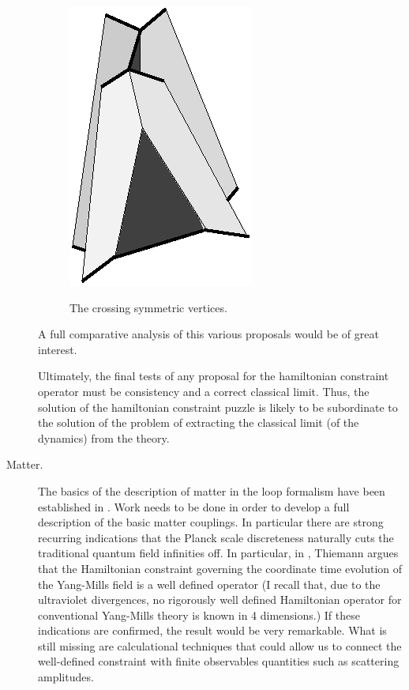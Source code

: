 \documentclass[12pt]{article}
\begin{document}
\begin{description}
\begin{figure}
{ \mbox{\includegraphics{RovelliFig5.eps}}}
 \caption{The crossing symmetric vertices.}
 \end{figure}

A full comparative analysis of this various proposals 
would be of great interest. 

Ultimately, the final tests of any proposal for the 
hamiltonian constraint operator must be consistency and a 
correct classical limit.  Thus, the solution of the 
hamiltonian constraint puzzle is likely to be subordinate 
to the solution of the problem of extracting the classical 
limit (of the dynamics) from the theory.
	
\item[Matter.] 

The basics of the description of matter in the loop 
formalism have been established in 
\cite{MoralesRovelli,MoralesRovelli2,KrasnovMatter,%
Baez,ThiemannFermions,ThiemannYM}.  Work needs to be done in order to 
develop a full description of the basic matter couplings.  In 
particular there are strong recurring indications that the Planck 
scale discreteness naturally cuts the traditional quantum field 
infinities off.  In particular, in \cite{ThiemannYM}, Thiemann argues 
that the Hamiltonian constraint governing the coordinate time 
evolution of the Yang-Mills field is a well defined operator (I recall 
that, due to the ultraviolet divergences, no rigorously well defined 
Hamiltonian operator for conventional Yang-Mills theory is known in 4 
dimensions.)  If these indications are confirmed, the result would be 
very remarkable.  What is still missing are calculational techniques 
that could allow us to connect the well-defined constraint with finite 
observables quantities such as scattering amplitudes.


\end{description}
\end{document}
